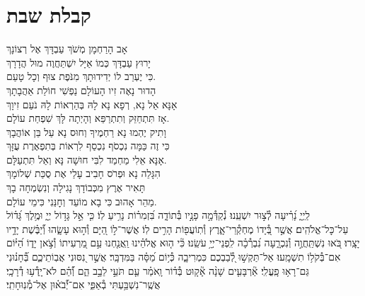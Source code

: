 \documentclass[twoside, openany, parskip=half, 11pt]{book}
\begin{document}
\chapter[קבלת שבת]{ קבלת שבת }
\label{kabalas_shabbos}

אָב הָרַחְמָן מְשֹׁךְ עַבְדָּךְ אֶל רְצוֹנָךְ\\
יָרוּץ עַבְדָּךְ כְּמוֹ אַיָּל יִשְׁתַּחֲוֶה מוּל הֲדָרָךְ\\
כִּי יֶעְרַב לוֹ יְדִידוּתָךְ מִנֹּפֶת צוּף וְכָל טָעַם.\\


הָדוּר נָאֶה זִיו הָעוֹלָם נַפְשִׁי חוֹלַת אַהֲבָתָךְ\\
אָנָּא אֵל נָא, רְפָא נָא לָהּ בְּהַרְאוֹת לָהּ נֹעַם זִיוָךְ\\
אָז תִּתְחַזֵּק וְתִתְרַפֵּא וְהָיְתָה לָּךְ שִׁפְחַת עוֹלָם.\\


וָתִיק יֶהְמוּ נָא רַחְמֶיךָ וְחוּס נָא עַל בֵּן אוֹהֲבָךְ\\
כִּי זֶה כַּמָּה נִכְסֹף נִכְסַף לִרְאוֹת בְּתִפְאֶרֶת עֻזָּךְ\\
אָנָּא אֵלִי מַחְמַד לִבִּי חוּשָׁה נָּא וְאַל תִּתְעַלָּם.\\

הִגָּלֵה נָא וּפְרֹס חָבִיב עָלַי אֶת סֻכַּת שְׁלוֹמָךְ\\
תָּאִיר אֶרֶץ מִכְּבוֹדָךְ נָגִילָה וְנִשְׂמְחָה בָךְ\\
מַהֵר אָהוּב כִּי בָא מוֹעֵד וְחׇנֵּנִי כִּימֵי עוֹלָם.\\

לַֽיְיָ֑ נָ֝רִ֗יעָה לְ֯צ֣וּר יִשְׁעֵֽנוּ׃
נְ֯קַדְּ֯מָ֣ה פָנָ֣יו בְּ֯תוֹדָ֑ה בִּ֝זְמִר֗וֹת נָרִ֥יעַ לֽוֹ׃
כִּ֤י אֵ֣ל גָּד֣וֹל יְיָ֑ וּמֶ֥לֶךְ גָּ֝ד֗וֹל עַל־כׇּל־אֱלֹהִֽים׃
אֲשֶׁ֣ר בְּ֭֯יָדוֹ מֶחְקְ֯רֵי־אָ֑רֶץ וְ֯תֽוֹעֲפ֖וֹת הָרִ֣ים לֽוֹ׃
אֲשֶׁר־ל֣וֹ הַ֭יָּם וְ֯ה֣וּא עָשָׂ֑הוּ וְ֝֯יַבֶּ֗שֶׁת יָדָ֥יו יָצָֽרוּ׃
בֹּ֭אוּ נִשְׁתַּֽחֲוֶ֣ה וְ֯נִכְרָ֑עָה נִ֝בְרְ֯כָ֗ה לִֽפְנֵי־יְיָ֥ עֹשֵֽׂנוּ׃
כִּ֘י ה֤וּא אֱלֹהֵ֗ינוּ וַֽאֲנַ֤חְנוּ עַ֣ם מַ֭רְעִיתוֹ וְ֯צֹ֣אן יָד֑וֹ הַ֝יּ֗וֹם אִם־בְּ֯קֹל֥וֹ תִשְׁמָֽעוּ׃
אַל־תַּקְשׁ֣וּ לְ֭֯בַבְכֶם כִּמְרִיבָ֑ה כְּ֯י֥וֹם מַ֝סָּ֗ה בַּמִּדְבָּֽר׃
אֲשֶׁ֣ר נִ֭סּוּנִי אֲבֽוֹתֵיכֶ֑ם בְּ֝֯חָנ֗וּנִי גַּם־רָא֥וּ פָֽעֳלִֽי׃
אַ֘רְבָּעִ֤ים שָׁנָ֨ה אָ֘ק֤וּט בְּ֯ד֗וֹר וָֽאֹמַ֗ר עַ֤ם תֹּעֵ֣י לֵבָ֣ב הֵ֑ם וְ֝֯הֵ֗ם לֹא־יָֽדְ֯ע֥וּ דְ֯רָכָֽי׃
אֲשֶֽׁר־נִשְׁבַּ֥עְתִּי בְ֯אַפִּ֑י אִם־יְ֝֯בֹא֗וּן אֶל־מְ֯נֽוּחָתִֽי׃
\end{document}
